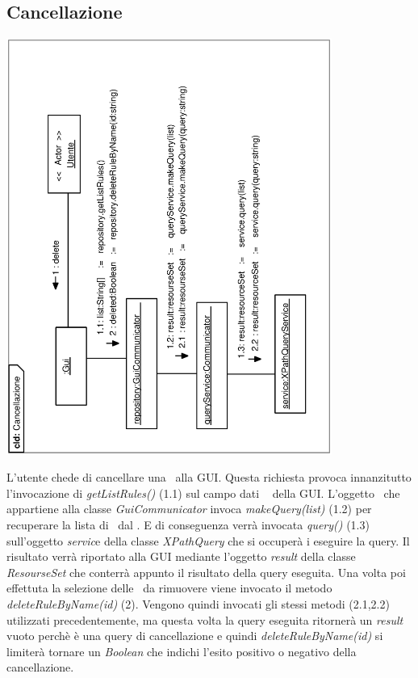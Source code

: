 \documentclass[11pt,titlepage,a4paper]{report}
\begin{document}
\subsection{Cancellazione \br}
\begin{center}
 \includegraphics[width=0.8\textwidth, angle=-90]{Cancellazione-cld.eps}
\end{center}
L'utente chede di cancellare una \br\ alla GUI. Questa richiesta provoca innanzitutto l'invocazione di \textit{getListRules()} (1.1) sul campo dati \textit{\re\ } della GUI. L'oggetto \re\ che appartiene alla classe \textit{GuiCommunicator} invoca \textit{makeQuery(list)} (1.2) per recuperare la lista di \brs\ dal \re. E di conseguenza verr\`a invocata \textit{query()} (1.3) sull'oggetto \textit{servic}e della classe \textit{XPathQuery} che si occuperà i eseguire la query. Il risultato verr\`a riportato alla GUI mediante l'oggetto \textit{result} della classe \textit{ResourseSet} che conterrà appunto il risultato della query eseguita. Una volta poi effettuta la selezione delle \brs\ da rimuovere viene invocato il metodo \textit{deleteRuleByName(id)} (2). Vengono quindi invocati gli stessi metodi (2.1,2.2) utilizzati precedentemente, ma questa volta la query eseguita ritorner\`a un \textit{result} vuoto perch\`e \`e una query di cancellazione e quindi \textit{deleteRuleByName(id)} si limiter\`a tornare un \textit{Boolean} che indichi l'esito positivo o negativo della cancellazione.
\end{document}
